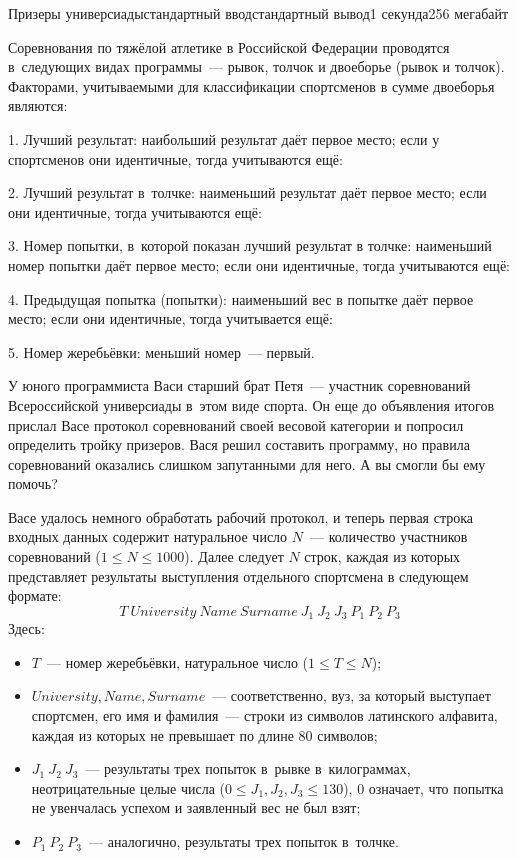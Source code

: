 \begin{problem}{Призеры универсиады}{стандартный ввод}{стандартный вывод}{1 секунда}{256 мегабайт}

Соревнования по тяжёлой атлетике в Российской Федерации проводятся в~следующих видах программы~--- рывок, толчок и двоеборье (рывок и толчок). Факторами, учитываемыми для классификации спортсменов в сумме двоеборья являются:

1. Лучший результат: наибольший результат даёт первое место; если у спортсменов они идентичные, тогда учитываются ещё:

2. Лучший результат в~толчке: наименьший результат даёт первое место; если они идентичные, тогда учитываются ещё:

3. Номер попытки, в~которой показан лучший результат в толчке: наименьший номер попытки даёт первое место; если они идентичные, тогда учитываются ещё:

4. Предыдущая попытка (попытки): наименьший вес в попытке даёт первое место; если они идентичные, тогда учитывается ещё:

5. Номер жеребьёвки: меньший номер~--- первый.

У юного программиста Васи старший брат Петя~--- участник соревнований Всероссийской универсиады в~этом виде спорта. Он еще до объявления итогов прислал Васе протокол соревнований своей весовой категории и попросил определить тройку призеров. Вася решил составить программу, но правила соревнований оказались слишком запутанными для него. А вы смогли бы ему помочь?

\InputFile
Васе удалось немного обработать рабочий протокол, и теперь первая строка входных данных содержит натуральное число $N$~--- количество участников соревнований ($1 \le N \le 1000$). Далее следует $N$ строк, каждая из которых представляет результаты выступления отдельного спортсмена в следующем формате:
$$T\ University\ Name\ Surname\ J_1\ J_2\ J_3\ P_1\ P_2\ P_3$$
Здесь:
\begin{itemize}
\item $T$~--- номер жеребьёвки, натуральное число ($1 \le T \le N$);
\item $University, Name, Surname$~--- соответственно, вуз, за который выступает спортсмен, его имя и фамилия~--- строки из символов латинского алфавита, каждая из которых не превышает по длине 80 символов;
\item $J_1\ J_2\ J_3$~--- результаты трех попыток в~рывке в~килограммах, неотрицательные целые числа ($0 \le J_1, J_2, J_3 \le 130$), 0 означает, что попытка не увенчалась успехом и заявленный вес не был взят;
\item $P_1\ P_2\ P_3$~--- аналогично, результаты трех попыток в~толчке.
\end{itemize}


\end{problem}
